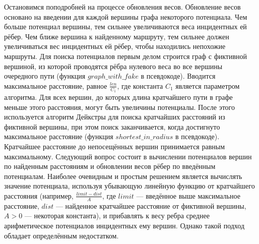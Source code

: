 Остановимся поподробней на процессе обновления весов. Обновление весов
основано на введении для каждой вершины графа некоторого потенциала.
Чем больше потенциал вершины, тем сильнее увеличиваются веса
инцидентных ей рёбер. Чем ближе вершина к найденному маршруту, тем
сильнее должен увеличиваться вес инцидентных ей рёбер, чтобы
находились непохожие маршруты. Для поиска потенциалов первым делом
строится граф с фиктивной вершиной, из которой проводятся рёбра
нулевого веса во все вершины очередного пути (функция
$graph\_with\_fake$ в псевдокоде). Вводится максимальное расстояние,
равное $\frac{len}{C_1}$, где константа $C_1$ является параметром
алгоритма. Для всех вершин, до которых длина кратчайшего пути в графе
меньше этого расстояния, могут быть увеличины потенциалы. После этого
используется алгоритм Дейкстры для поиска кратчайших расстояний из
фиктивной вершины, при этом поиск заканчивается, когда достигнуто
максимальное расстояние (функция $shortest\_in\_radius$ в псевдокоде).
Кратчайшее расстояние до непосещённых вершин принимается равным
максимальному. Следующий вопрос состоит в вычислении потенциалов
вершин по найденным расстояниям и обновлении весов рёбер по введённым
потенциалам. Наиболее очевидным и простым решением является вычислять
значение потенциала, используя убывающую линейную функцию от
кратчайшего расстояния (например, $\frac{limit - dist}{A}$, где
$limit$ --- введённое выше максимальное расстояние, $dist$ ---
найденное кратчайшее расстояние от фиктивной вершины, $A > 0$ ---
некоторая константа), и прибавлять к весу ребра среднее арифметическое
потенциалов инцидентных ему вершин. Однако такой подход обладает
определённым недостатком.

